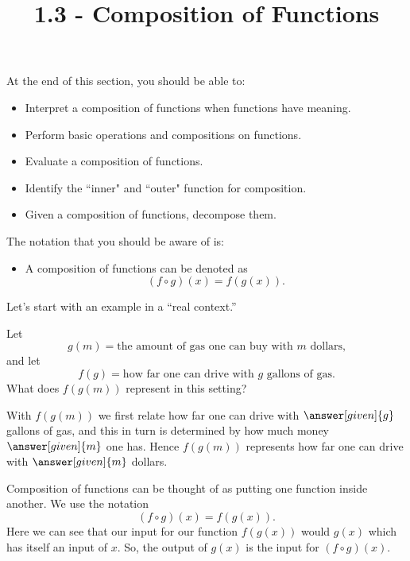 \documentclass{ximera}
\title{1.3 - Composition of Functions}
\begin{document}
\begin{abstract} \end{abstract}
\maketitle

At the end of this section, you should be able to:
\begin{itemize}
    \item Interpret a composition of functions when functions have meaning.
    \item Perform basic operations and compositions on functions.
      \item Evaluate a composition of functions.
      \item Identify the ``inner" and ``outer" function for composition.
    \item Given a composition of functions, decompose them.
    
  
\end{itemize}

The notation that you should be aware of is:
\begin{itemize}
    \item A composition of functions can be denoted as $$(f\circ g)(x)=f(g(x)).$$
\end{itemize}
Let's start with an example in a
``real context.''

\begin{example}
  Let
  \[
  g(m) = \text{the amount of gas one can buy with $m$ dollars,}
  \]
  and let
  \[
  f(g) = \text{how far one can drive with $g$ gallons of gas.}
  \]
  What does $f(g(m))$ represent in this setting?
  \begin{explanation}
    With $f(g(m))$ we first relate how far one can drive with
    $\answer[given]{g}$ gallons of gas, and this in turn is determined
    by how much money $\answer[given]{m}$ one has. Hence $f(g(m))$ represents how far
    one can drive with $\answer[given]{m}$ dollars.
  \end{explanation}
\end{example}

Composition of functions can be thought of as putting one function
inside another.  We use the notation
\[
(f\circ g)(x) = f(g(x)).
\]
Here we can see that our input for our function $f(g(x))$ would $g(x)$ which has itself an input of $x$. So, the output of $g(x)$ is the input for $(f\circ g)(x)$.
\end{document}
